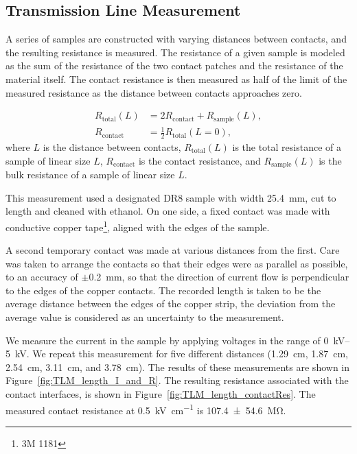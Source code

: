 \documentclass[a4paper,12pt]{article}
\newcommand{\DR}{DR8}
\begin{document}


\subsection{Transmission Line Measurement}
\label{sec:transLine}

A series of samples are constructed with varying distances between contacts, and the resulting resistance is measured.
The resistance of a given sample is modeled as the sum of the resistance of the two contact patches and the resistance of the material itself.  
The contact resistance is then measured as half of the limit of the measured resistance as the distance between contacts approaches zero.

\begin{equation} \label{eq:TLM}
	\begin{split} 
		R_{\mathrm{total}}(L) &= 2 R_{\mathrm{contact}} + R_{\mathrm{sample}}(L), \\
		R_{\mathrm{contact}}  &= \tfrac{1}{2} R_{\mathrm{total}}(L = 0),
	\end{split}
\end{equation}
where $L$ is the distance between contacts, $R_{\mathrm{total}}(L)$ is the total resistance of a sample of linear size $L$, $R_\mathrm{contact}$ is the contact resistance, and $R_{\mathrm{sample}}(L)$ is the bulk resistance of a sample of linear size $L$.

This measurement used a designated {\DR} sample with width \SI{25.4}{\milli\meter}, cut to length and cleaned with ethanol.  On one side, a fixed contact was made with conductive copper tape\footnote{3M 1181}, aligned with the edges of the sample.

A second temporary contact was made at various distances from the first.
Care was taken to arrange the contacts so that their edges were as parallel as possible, to an accuracy of $\pm$\SI{0.2}{\milli\metre}, so that the direction of current flow is perpendicular to the edges of the copper contacts.
The recorded length is taken to be the average distance between the edges of the copper strip, the deviation from the average value is considered as an uncertainty to the measurement.

We measure the current in the sample by applying voltages in the range of \SIrange{0}{5}{\kilo\volt}.
We repeat this measurement for five different distances (\SI{1.29}{\centi\metre}, \SI{1.87}{\centi\metre}, \SI{2.54}{\centi\metre}, \SI{3.11}{\centi\metre}, and \SI{3.78}{\centi\metre}).
The results of these measurements are shown in Figure~\ref{fig:TLM_length_I_and_R}. 
The resulting resistance associated with the contact interfaces, is shown in Figure~\ref{fig:TLM_length_contactRes}.  
The measured contact resistance at \SI{0.5}{\kilo\volt\per\centi\metre} is \SI{107.4 \pm 54.6}{\mega\ohm}.
\end{document}
